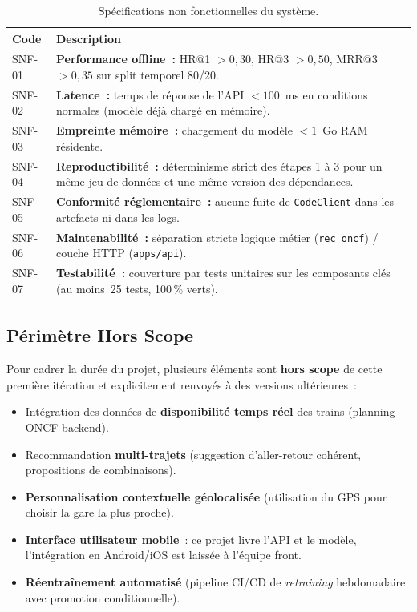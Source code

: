 \documentclass[11pt, a4paper]{article}
\begin{document}
\begin{table}[h]
\centering
\small
\begin{tabularx}{\textwidth}{|l|X|}
\hline
\textbf{Code} & \textbf{Description} \\
\hline
SNF-01 & \textbf{Performance offline~:} HR@1 $> 0{,}30$, HR@3 $> 0{,}50$,
         MRR@3 $> 0{,}35$ sur split temporel 80/20. \\
\hline
SNF-02 & \textbf{Latence~:} temps de réponse de l'API $< 100$~ms en
         conditions normales (modèle déjà chargé en mémoire). \\
\hline
SNF-03 & \textbf{Empreinte mémoire~:} chargement du modèle $< 1$~Go RAM
         résidente. \\
\hline
SNF-04 & \textbf{Reproductibilité~:} déterminisme strict des étapes 1 à 3
         pour un même jeu de données et une même version des dépendances. \\
\hline
SNF-05 & \textbf{Conformité réglementaire~:} aucune fuite de
         \texttt{CodeClient} dans les artefacts ni dans les logs. \\
\hline
SNF-06 & \textbf{Maintenabilité~:} séparation stricte logique métier
         (\texttt{rec\_oncf}) / couche HTTP (\texttt{apps/api}). \\
\hline
SNF-07 & \textbf{Testabilité~:} couverture par tests unitaires sur les
         composants clés (au moins~25 tests, 100\,\% verts). \\
\hline
\end{tabularx}
\caption{Spécifications non fonctionnelles du système.}
\end{table}

\subsection{Périmètre Hors Scope}

Pour cadrer la durée du projet, plusieurs éléments sont \textbf{hors
scope} de cette première itération et explicitement renvoyés à des
versions ultérieures~:
\begin{itemize}
\item Intégration des données de \textbf{disponibilité temps réel} des
    trains (planning ONCF backend).
\item Recommandation \textbf{multi-trajets} (suggestion d'aller-retour
    cohérent, propositions de combinaisons).
\item \textbf{Personnalisation contextuelle géolocalisée} (utilisation
    du GPS pour choisir la gare la plus proche).
\item \textbf{Interface utilisateur mobile}~: ce projet livre l'API et
    le modèle, l'intégration en Android/iOS est laissée à l'équipe
    front.
\item \textbf{Réentraînement automatisé} (pipeline CI/CD de
    \textit{retraining} hebdomadaire avec promotion conditionnelle).
\end{itemize}
\end{document}
